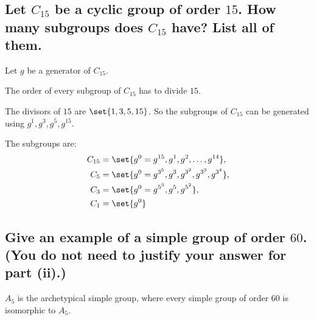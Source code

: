 \section[Problem 1]{
}  
    \subsection[(i)]{Let $C_{15}$ be a cyclic group of order $15$. 
        How many subgroups does $C_{15}$ have? List all of them.
    }
        Let $g$ be a generator of $C_{15}$.

        The order of every subgroup of $C_{15}$ has to divide $15$.

        The divisors of $15$ are $\set{1,3,5,15}$.
        So the subgroups of $C_{15}$ can be generated using $g^1, g^3, g^5, g^{15}$.

        The subgroups are:
        \begin{align*}
                C_{15} &= \set{g^0 = g^{15}, g^1, g^2 , \hdots, g^{14}}, \\
                C_{5} &= \set{g^0 = g^{3^5}, g^{3}, g^{3^2}, g^{3^3}, g^{3^4}}, \\
                C_{3} &= \set{g^0 = g^{5^3}, g^{5}, g^{5^2}}, \\
                C_{1} &= \set{g^0}
        \end{align*}

    \subsection[(ii)]{Give an example of a simple group of order $60$.
        (You do not need to justify your answer for part (ii).)
    }
        $A_5$ is the archetypical simple group,
        where every simple group of order $60$ is isomorphic to $A_5$.